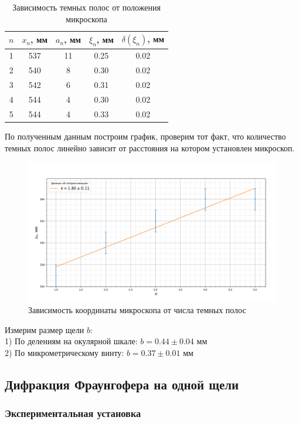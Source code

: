 \documentclass[a4paper, 12pt]{article}%
\begin{document}
	
	\begin{table}[H]
		\centering
		\begin{tabular}{|c|c|c|c|c|}
			\hline
			$n$ & $x_n$, мм & $a_n$, мм & $\xi_n$, мм  & $\delta(\xi_n)$, мм \\ \hline
			1 & 537 & 11  & 0.25 & 0.02      \\ \hline
			2 & 540 & 8   & 0.30 & 0.02      \\ \hline
			3 & 542 & 6   & 0.31 & 0.02      \\ \hline
			4 & 544 & 4   & 0.30 & 0.02      \\ \hline
			5 & 544 & 4   & 0.33 & 0.02      \\ \hline
		\end{tabular}
	\caption{Зависимость темных полос от положения микроскопа}
	\end{table}
	По полученным данным построим график, проверим тот факт, что количество темных полос линейно зависит от расстояния на котором установлен микроскоп.
	\begin{figure}[H]
		\centering
		\includegraphics[width=0.9\linewidth]{Figure_1}
		\caption{Зависимость координаты микроскопа от числа темных полос}
		\label{fig:figure1}
	\end{figure}
	 Измерим размер щели $b$:\\
	 1) По делениям на окулярной шкале: $b = 0.44 \pm 0.04$ мм\\
	 2) По микрометрическому винту: $b = 0.37 \pm 0.01$ мм\\
	 
	 \subsection{Дифракция Фраунгофера на одной щели}
	 
	 \subsubsection{Экспериментальная установка}
	 
\end{document}
